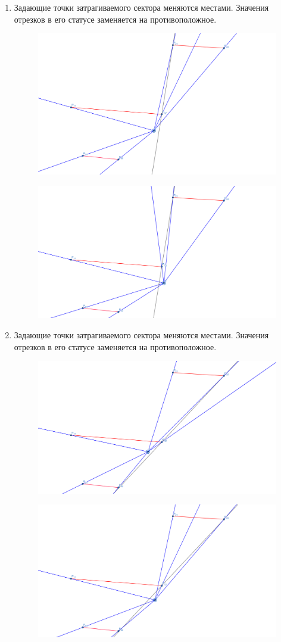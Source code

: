 \documentclass[letterpaper,12pt]{article}
\begin{document}
\begin{enumerate}
\begin{figure}[H]
            \end{figure}
      \item Задающие точки затрагиваемого сектора меняются местами.
            Значения отрезков в его статусе заменяется на противоположное.
            \begin{figure}[H]
            \centering
            \includegraphics[width=0.5\linewidth]{one_side_1_1.png}
            \end{figure}
            \begin{figure}[H]
            \centering
            \includegraphics[width=0.5\linewidth]{one_side_1_2.png}
            \end{figure}
      \item Задающие точки затрагиваемого сектора меняются местами.
            Значения отрезков в его статусе заменяется на противоположное.
            \begin{figure}[H]
            \centering
            \includegraphics[width=0.5\linewidth]{one_side_2_1.png}
            \end{figure}
            \begin{figure}[H]
            \centering
            \includegraphics[width=0.5\linewidth]{one_side_2_2.png}

\end{figure}
\end{enumerate}
\end{document}
